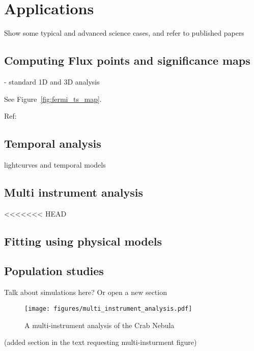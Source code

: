 \section{Applications}
\label{sec:applications}

Show some typical and advanced science cases, and refer to published papers

\subsection{Computing Flux points and significance maps}
\label{ssec:1D-3D-analysis}


- standard 1D and 3D analysis

See Figure~\ref{fig:fermi_ts_map}.


Ref:~\citep{Stewart2009}

\subsection{Temporal analysis}
\label{ssec:temporal-analysis}

lightcurves and temporal models

\subsection{Multi instrument analysis}
\label{ssec:multi-instrument-analysis}

<<<<<<< HEAD
\subsection{Fitting using physical models}
\label{ssec:naima-models-analysis}
\todo{}

\subsection{Population studies}
\label{ssec:population-studies}

Talk about simulations here? Or open a new section







\begin{figure*}[t]
	\centering
	\texttt{[image: figures/multi\_instrument\_analysis.pdf]}
	\caption{A multi-instrument analysis of the Crab Nebula}
	\label{fig:multi_instrument_analysis} 
\end{figure*}

(added section in the text requesting multi-insturment figure)
